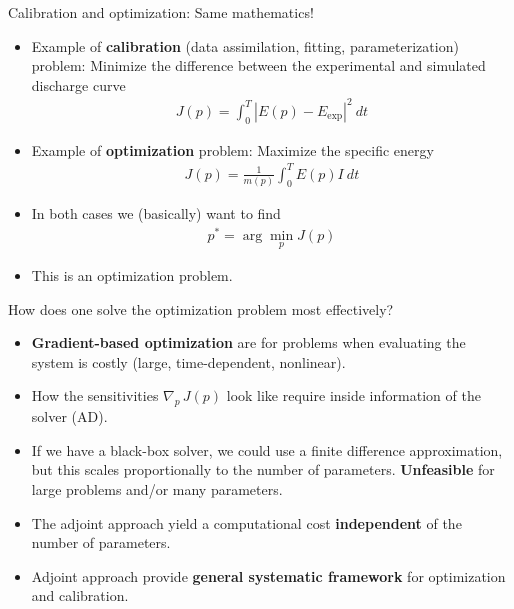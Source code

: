 \documentclass{beamer}
\begin{document}
\begin{frame}{Calibration and optimization: Same mathematics!}

  \begin{itemize}
  \item  Example of {\bf calibration} (data assimilation, fitting, parameterization) problem:
    Minimize the difference between the experimental and
    simulated discharge curve
    \begin{align*}
      J(p) = \int_0^T |E(p) - E_\text{exp}|^2 \ dt
    \end{align*}
  \item Example of {\bf optimization} problem: Maximize the specific energy
    \begin{align*}
      J(p) = \frac{1}{m(p)} \int_0^T E(p)I  \  dt
    \end{align*}
  \item In both cases we (basically) want to find
  \begin{align*}
    p^* = \arg \min_p J(p)
  \end{align*}
  \item This is an optimization problem.
  \end{itemize}

\end{frame}

\begin{frame}{How does one solve the optimization problem most effectively?}

  \begin{itemize}
  \item {\bf Gradient-based optimization} are for problems when
    evaluating the system is costly (large, time-dependent,
    nonlinear).
  \item How the sensitivities  $\nabla_p\, J(p)$ look like require inside information of the
    solver (AD).
  \item If we have a black-box solver, we could use a finite difference approximation, but this scales proportionally to the number of parameters.
    {\bf Unfeasible} for large problems and/or many parameters.
  \item The adjoint approach yield a computational cost {\bf independent}
    of the number of parameters.
  \item Adjoint approach provide {\bf general systematic framework} for optimization
    and calibration.
  \end{itemize}

\end{frame}
\end{document}
